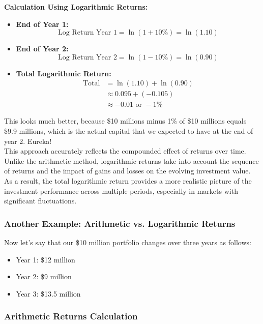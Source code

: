 \documentclass{article}
\begin{document}
\textbf{Calculation Using Logarithmic Returns:}

\begin{itemize}
    \item \textbf{End of Year 1:}
      \[ \text{Log Return Year 1} = \ln(1 + 10\%) = \ln(1.10) \]
    \item \textbf{End of Year 2:}
      \[ \text{Log Return Year 2} = \ln(1 - 10\%) = \ln(0.90) \]
    \item \textbf{Total Logarithmic Return:}
      \begin{align*}
      \text{Total} &= \ln(1.10) + \ln(0.90) \\
                   &\approx 0.095 + (-0.105) \\
                   &\approx -0.01 \text{ or } -1\%
      \end{align*}
\end{itemize}

This looks much better, because \$10 millions minus 1\% of \$10 millions equals \$9.9 millions, which is the actual capital that we expected to have at the end of year 2. Eureka! \\

This approach accurately reflects the compounded effect of returns over time. Unlike the arithmetic method, logarithmic returns take into account the sequence of returns and the impact of gains and losses on the evolving investment value. As a result, the total logarithmic return provides a more realistic picture of the investment performance across multiple periods, especially in markets with significant fluctuations.          
\\

\subsubsection{Another Example: Arithmetic vs. Logarithmic Returns}

Now let's say that our \$10 million portfolio changes over three years as follows:

\begin{itemize}
    \item Year 1: \$12 million
    \item Year 2: \$9 million
    \item Year 3: \$13.5 million
\end{itemize}

\subsubsection{Arithmetic Returns Calculation}
\end{document}
